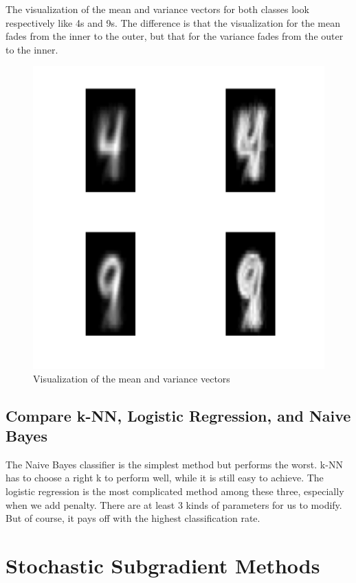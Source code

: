 \documentclass{article}
\begin{document}
The visualization of the mean and variance vectors for both classes look respectively like 4s and 9s. The difference is that the visualization for the mean fades from the inner to the outer, but that for the variance fades from the outer to the inner.
\begin{figure}
\centering
\includegraphics[scale=0.4]{5.png}
\caption{Visualization of the mean and variance vectors}
\end{figure}

\subsection{Compare k-NN, Logistic Regression, and Naive Bayes}
The Naive Bayes classifier is the simplest method but performs the worst. k-NN has to choose a right k to perform well, while it is still easy to achieve. The logistic regression is the most complicated method among these three, especially when we add penalty. There are at least 3 kinds of parameters for us to modify. But of course, it pays off with the highest classification rate.

\section{Stochastic Subgradient Methods}
\end{document}
